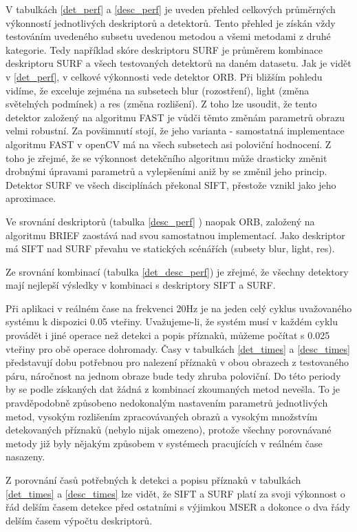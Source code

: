 V tabulkách \ref{det_perf} a \ref{desc_perf} je uveden přehled celkových průměrných výkonností jednotlivých deskriptorů
a detektorů. Tento přehled je získán vždy testováním uvedeného subsetu uvedenou metodou a všemi
metodami z druhé kategorie. Tedy například skóre deskriptoru SURF je průměrem kombinace
deskriptoru SURF a všech testovaných detektorů na daném datasetu.
Jak je vidět v \ref{det_perf}, v celkové výkonnosti vede detektor ORB. Při bližším pohledu vidíme, že exceluje
zejména na subsetech blur (rozostření), light (změna světelných podmínek) a res (změna rozlišení).
Z toho lze usoudit, že tento detektor založený na algoritmu FAST je vůdči těmto změnám parametrů obrazu
velmi robustní. Za povšimnutí stojí, že jeho varianta - samostatná implementace algoritmu FAST 
v openCV má na všech subsetech asi poloviční hodnocení. Z toho je zřejmé, že se výkonnost detekčního
algoritmu může drasticky změnit drobnými úpravami parametrů a vylepšeními aniž by se změnil jeho princip.
Detektor SURF ve všech disciplínách překonal SIFT, přestože vznikl jako jeho aproximace.

Ve srovnání deskriptorů (tabulka \ref{desc_perf} ) naopak ORB, založený na algoritmu BRIEF zaostává nad svou samostatnou implementací.
Jako deskriptor má SIFT nad SURF převahu ve statických scénářích (subsety blur, light, res).

Ze srovnání kombinací (tabulka \ref{det_desc_perf}) je zřejmé, že všechny detektory mají nejlepší výsledky v kombinaci s deskriptory SIFT a SURF.

Při aplikaci v reálném čase na frekvenci 20Hz je na jeden celý cyklus uvažovaného systému k dispozici 0.05 vteřiny. Uvažujeme-li, že systém musí v každém cyklu provádět i jiné operace než detekci a popis příznaků, můžeme počítat s 0.025 vteřiny pro obě operace dohromady. Časy v tabulkách \ref{det_times} a \ref{desc_times} představují dobu potřebnou pro nalezení příznaků v obou obrazech z testovaného páru, náročnost na jednom obraze bude tedy zhruba poloviční. Do této periody by se podle získaných dat žádná z kombinací zkoumaných metod nevešla. To je pravděpodobně způsobeno nedokonalým nastavením parametrů jednotlivých metod, vysokým rozlišením zpracovávaných obrazů a vysokým množstvím detekovaných příznaků (nebylo nijak omezeno), protože všechny porovnávané metody již byly nějakým způsobem v systémech pracujících v reálném čase nasazeny.

Z porovnání časů potřebných k detekci a popisu příznaků v tabulkách \ref{det_times} a \ref{desc_times} lze vidět, že SIFT a SURF platí za svoji
výkonnost o řád delším časem detekce před ostatními s výjimkou MSER a dokonce o dva řády delším časem výpočtu deskriptorů.

